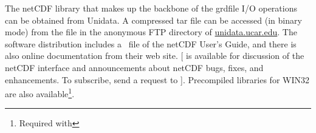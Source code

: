 
The netCDF library that makes up the backbone of the grdfile
I/O operations can be obtained from  Unidata.  A compressed
tar file can be accessed (in binary mode) from the file
 in the anonymous FTP directory of
\underline{unidata.ucar.edu}.
The software distribution includes a \PS\ file of
the netCDF User's Guide, and there is also online documentation
from their web site.  [
is available for discussion of the netCDF interface and
announcements about netCDF bugs, fixes, and enhancements.  To
subscribe, send a request to
].
Precompiled libraries for WIN32 are also available\footnote{Required
with }.

